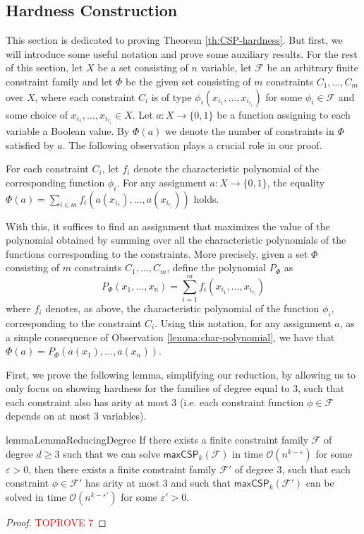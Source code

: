 \documentclass[a4paper,UKenglish,cleveref, autoref, thm-restate,numberwithinsect]{lipics-v2021}
\newcommand{\bigO}{\mathcal{O}}
\newcommand{\maxcspk}{\textsf{maxCSP}_{k}}
\newcommand{\Fam}{\mathcal{F}}
\begin{document}
\subsection{Hardness Construction} This section is dedicated to proving Theorem \ref{th:CSP-hardness}.
But first, we will introduce some useful notation and prove some auxiliary results.
For the rest of this section, let $X$ be a set consisting of $n$ variable, let $\Fam$ be an arbitrary finite constraint family and let $\Phi$ be the given set consisting of $m$ constraints $C_1,\dots, C_m$ over $X$, where each constraint $C_i$ is of type $\phi_i(x_{i_1},\dots, x_{i_{r_i}})$ for some $\phi_i\in \Fam$ and some choice of $x_{i_1},\dots, x_{i_{r_i}}\in X$.
Let $a:X \to \{0,1\}$ be a function assigning to each variable a Boolean value. By $\Phi(a)$ we denote the number of constraints in $\Phi$ satisfied by $a$. 
The following observation plays a crucial role in our proof.
\begin{observation} \label{lemma:char-polynomial}
    For each constraint $C_i$, let $f_i$ denote the characteristic polynomial of the corresponding function $\phi_i$.
    For any assignment $a:X\to \{0,1\}$, the equality $\Phi(a) = \sum_{i\in m} f_i(a(x_{i_1}), \dots, a(x_{i_{r_i}}))$ holds.
\end{observation}

With this, it suffices to find an assignment that maximizes the value of the polynomial obtained by summing over all the characteristic polynomials of the functions corresponding to the constraints. 
More precisely, given a set $\Phi$ consisting of $m$ constraints $C_1,\dots, C_m$, define the polynomial $P_\Phi$ as 
\[
    P_\Phi(x_1,\dots, x_n) = \sum_{i=1}^m f_i(x_{i_1},\dots, x_{i_{r_i}})
\]
where $f_i$ denotes, as above, the characteristic polynomial of the function $\phi_i$, corresponding to the constraint $C_i$.
Using this notation, for any assignment $a$, as a simple consequence of Observation \ref{lemma:char-polynomial}, we have that $\Phi(a) = P_\Phi(a(x_1),\dots, a(x_n))$.


First, we prove the following lemma, simplifying our reduction, by allowing us to only focus on showing hardness for the families of degree equal to $3$, such that each constraint also has arity at most $3$ (i.e. each constraint function $\phi \in \Fam$ depends on at most $3$ variables). 
\begin{restatable}{lemma}{LemmaReducingDegree}\label{lemma:reducing-degree}
    If there exists a finite constraint family $\Fam$ of degree $d \geq 3$ such that we can solve $\maxcspk(\Fam)$ in time $\bigO(n^{k-\varepsilon})$ for some $\varepsilon>0$, then there exists 
    a finite constraint family $\Fam'$ of degree $3$, such that each constraint $\phi\in \Fam'$ has arity at most $3$ and such that $\maxcspk(\Fam')$ can be solved in time $\bigO(n^{k-\varepsilon'})$ for some $\varepsilon'>0$.
\end{restatable}
\begin{proof}\textcolor{red}{TOPROVE 7}\end{proof}
\end{document}
